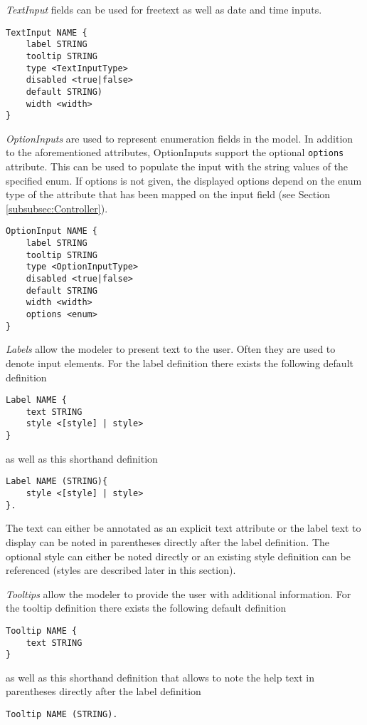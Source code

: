 \textit{TextInput} fields can be used for freetext as well as date and time inputs.
\begin{lstlisting}
TextInput NAME { 
	label STRING
	tooltip STRING
	type <TextInputType>
	disabled <true|false>
	default STRING)
	width <width>
}
\end{lstlisting}

\textit{OptionInputs} are used to represent enumeration fields in the model. In addition to the aforementioned attributes, OptionInputs support the optional \lstinline!options! attribute. This can be used to populate the input with the string values of the specified enum. If options is not given, the displayed options depend on the enum type of the attribute that has been mapped on the input field (see Section \ref{subsubsec:Controller}).
\begin{lstlisting}
OptionInput NAME { 
	label STRING
	tooltip STRING
	type <OptionInputType>
	disabled <true|false>
	default STRING
	width <width>
	options <enum>
}
\end{lstlisting}

\textit{Labels} allow the modeler to present text to the user. Often they are used to denote input elements. For the label definition there exists the following default definition
\begin{lstlisting}
Label NAME {
	text STRING
	style <[style] | style>
}
\end{lstlisting}
as well as this shorthand definition
\begin{lstlisting}
Label NAME (STRING){
	style <[style] | style>
}.
\end{lstlisting}

The text can either be annotated as an explicit text attribute or the label text to display can be noted in parentheses directly after the label definition. The optional style can either be noted directly or an existing style definition can be referenced (styles are described later in this section).

\textit{Tooltips} allow the modeler to provide the user with additional information. For the tooltip definition there exists the following default definition
\begin{lstlisting}
Tooltip NAME {
	text STRING
}
\end{lstlisting}

as well as this shorthand definition that allows to note the help text in parentheses directly after the label definition
\begin{lstlisting}
Tooltip NAME (STRING).
\end{lstlisting}

